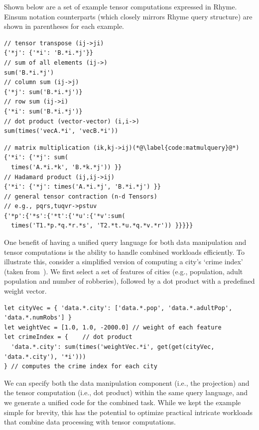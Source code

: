 \documentclass[runningheads]{llncs}
\newcommand{\lang}{Rhyme}
\begin{document}
Shown below are a set of example tensor computations expressed in \lang{}.
Einsum notation counterparts (which closely mirrors \lang{} query structure) 
are shown in parentheses for each example.

\hspace{-18pt}
\begin{minipage}{0.5\textwidth}
\begin{lstlisting}[style=JavaScript,columns=flexible]
// tensor transpose (ij->ji)
{'*j': {'*i': 'B.*i.*j'}}
// sum of all elements (ij->)
sum('B.*i.*j')
// column sum (ij->j)
{'*j': sum('B.*i.*j')}
// row sum (ij->i)
{'*i': sum('B.*i.*j')}
// dot product (vector-vector) (i,i->)
sum(times('vecA.*i', 'vecB.*i'))
\end{lstlisting}
\end{minipage}%
\begin{minipage}{0.5\textwidth}
\begin{lstlisting}[style=JavaScript,columns=flexible]
// matrix multiplication (ik,kj->ij)(*@\label{code:matmulquery}@*)
{'*i': {'*j': sum(
  times('A.*i.*k', 'B.*k.*j')) }}
// Hadamard product (ij,ij->ij)
{'*i': {'*j': times('A.*i.*j', 'B.*i.*j') }}
// general tensor contraction (n-d Tensors)
// e.g., pqrs,tuqvr->pstuv
{'*p':{'*s':{'*t':{'*u':{'*v':sum(
  times('T1.*p.*q.*r.*s', 'T2.*t.*u.*q.*v.*r')) }}}}}
\end{lstlisting}
\end{minipage}

One benefit of having a unified query language for both data manipulation and tensor
computations is the ability to handle combined workloads efficiently.
To illustrate this, consider a simplified version of computing a city's
`crime index' (taken from~\cite{weld}).
We first select a set of features of cities (e.g., population, 
adult population and number of robberies), followed by a dot product
with a predefined weight vector.

\begin{lstlisting}[style=JavaScript,columns=flexible]
let cityVec = { 'data.*.city': ['data.*.pop', 'data.*.adultPop', 'data.*.numRobs'] }
let weightVec = [1.0, 1.0, -2000.0] // weight of each feature
let crimeIndex = {    // dot product
  'data.*.city': sum(times('weightVec.*i', get(get(cityVec, 'data.*.city'), '*i')))
} // computes the crime index for each city
\end{lstlisting}

We can specify both the data manipulation component (i.e., the projection) and
the tensor computation (i.e., dot product) within the same query language, and
we generate a unified code for the combined task.
While we kept the example simple for brevity, this has the potential to optimize practical
intricate workloads that combine data processing with tensor computations.
\end{document}
